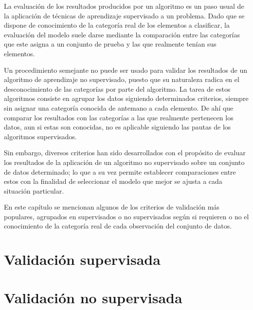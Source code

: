 La evaluación de los resultados producidos por un algoritmo es un paso usual de la aplicación de técnicas de aprendizaje supervisado a un problema.
Dado que se dispone de conocimiento de la categoría real de los elementos a clasificar, la evaluación del modelo suele darse mediante la comparación entre las categorías que este asigna a un conjunto de prueba y las que realmente tenían sus elementos.

Un procedimiento semejante no puede ser usado para validar los resultados de un algoritmo de aprendizaje no supervisado, puesto que su naturaleza radica en el desconocimiento de las categorías por parte del algoritmo.
La tarea de estos algoritmos consiste en agrupar los datos siguiendo determinados criterios, siempre sin asignar una categoría conocida de antemano a cada elemento.
De ahí que comparar los resultados con las categorías a las que realmente pertenecen los datos, aun si estas son conocidas, no es aplicable siguiendo las pautas de los algoritmos supervisados.

Sin embargo, diversos criterios han sido desarrollados con el propósito de evaluar los resultados de la aplicación de un algoritmo no supervisado sobre un conjunto de datos determinado;
lo que a su vez permite establecer comparaciones entre estos con la finalidad de seleccionar el modelo que mejor se ajusta a cada situación particular.

En este capítulo se mencionan algunos de los criterios de validación más populares, agrupados en supervisados o no supervisados según si requieren o no el conocimiento de la categoría real de cada observación del conjunto de datos.

\section{Validación supervisada}\label{sec:validaciónSupervisada}


\section{Validación no supervisada}\label{sec:validaciónNoSupervisada}
